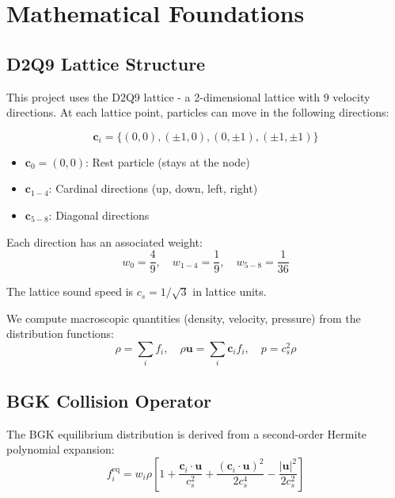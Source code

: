 \chapter{Mathematical Foundations}

\section{D2Q9 Lattice Structure}

This project uses the D2Q9 lattice - a 2-dimensional lattice with 9 velocity directions. At each lattice point, particles can move in the following directions:

\begin{equation}
\mathbf{c}_i = \{(0,0), (\pm1,0), (0,\pm1), (\pm1,\pm1)\}
\end{equation}

\begin{itemize}
    \item $\mathbf{c}_0 = (0,0)$: Rest particle (stays at the node)
    \item $\mathbf{c}_{1-4}$: Cardinal directions (up, down, left, right)
    \item $\mathbf{c}_{5-8}$: Diagonal directions
\end{itemize}

Each direction has an associated weight:
\begin{equation}
w_0 = \frac{4}{9}, \quad w_{1-4} = \frac{1}{9}, \quad w_{5-8} = \frac{1}{36}
\end{equation}

The lattice sound speed is $c_s = 1/\sqrt{3}$ in lattice units.

We compute macroscopic quantities (density, velocity, pressure) from the distribution functions:
\begin{equation}
\rho = \sum_i f_i, \quad \rho\mathbf{u} = \sum_i \mathbf{c}_i f_i, \quad p = c_s^2\rho
\end{equation}

\section{BGK Collision Operator}

The BGK equilibrium distribution is derived from a second-order Hermite polynomial expansion:
\begin{equation}
f_i^{\mathrm{eq}} = w_i \rho \left[1 + \frac{\mathbf{c}_i \cdot \mathbf{u}}{c_s^2} + \frac{(\mathbf{c}_i \cdot \mathbf{u})^2}{2c_s^4} - \frac{|\mathbf{u}|^2}{2c_s^2}\right]
\end{equation}

